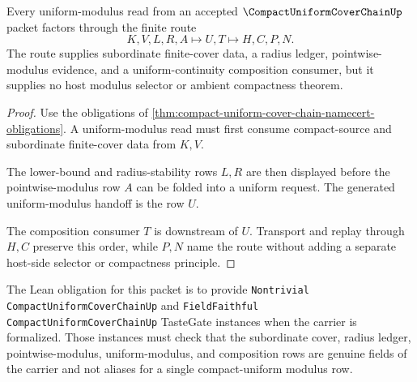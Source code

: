 \begin{theorem}
\label{thm:compact-uniform-cover-chain-uniform-modulus-handoff}
Every uniform-modulus read from an accepted $\CompactUniformCoverChainUp$ packet factors through the finite route
$$
K,V,L,R,A \longmapsto U,T \longmapsto H,C,P,N .
$$
The route supplies subordinate finite-cover data, a radius ledger, pointwise-modulus evidence, and a uniform-continuity composition consumer, but it supplies no host modulus selector or ambient compactness theorem.
\end{theorem}
\begin{proof}
Use the obligations of \autoref{thm:compact-uniform-cover-chain-namecert-obligations}. A uniform-modulus read must first consume compact-source and subordinate finite-cover data from $K,V$.

The lower-bound and radius-stability rows $L,R$ are then displayed before the pointwise-modulus row $A$ can be folded into a uniform request. The generated uniform-modulus handoff is the row $U$.

The composition consumer $T$ is downstream of $U$. Transport and replay through $H,C$ preserve this order, while $P,N$ name the route without adding a separate host-side selector or compactness principle.
\end{proof}

The Lean obligation for this packet is to provide
\texttt{Nontrivial CompactUniformCoverChainUp} and
\texttt{FieldFaithful CompactUniformCoverChainUp} TasteGate instances when the
carrier is formalized. Those instances must check that the subordinate cover,
radius ledger, pointwise-modulus, uniform-modulus, and composition rows are
genuine fields of the carrier and not aliases for a single compact-uniform
modulus row.


\begin{closurestatus}{\CompactUniformCoverChainUp}
  \theoryclosure{\seedClosure}
  \formalstatus{\unformalizedV}
\end{closurestatus}
